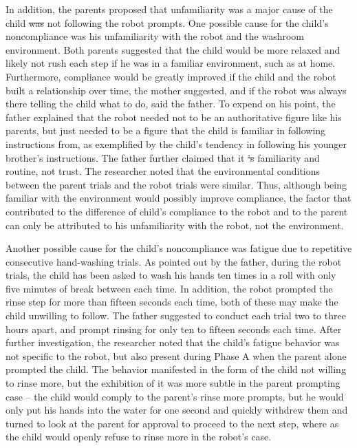 \documentclass{ut-thesis}
\providecommand{\DIFaddtex}[1]{{\protect\color{blue}\uwave{#1}}} %
\providecommand{\DIFdeltex}[1]{{\protect\color{red}\sout{#1}}}                      %
\providecommand{\DIFaddbegin}{} %
\providecommand{\DIFaddend}{} %
\providecommand{\DIFdelbegin}{} %
\providecommand{\DIFdelend}{} %
\providecommand{\DIFadd}[1]{\texorpdfstring{\DIFaddtex{#1}}{#1}} %
\providecommand{\DIFdel}[1]{\texorpdfstring{\DIFdeltex{#1}}{}} %
\begin{document}
In addition, the parents proposed that unfamiliarity was a major cause of the child \DIFdelbegin \DIFdel{was }\DIFdelend not following the robot prompts.  One possible cause for the child's noncompliance was his unfamiliarity with the robot and the washroom environment.  Both parents suggested that the child would be more relaxed and likely not rush each step if he was in a familiar environment, such as at home.  Furthermore, compliance would be greatly improved if the child and the robot built a relationship over time, the mother suggested, and if the robot was always there telling the child what to do, said the father.  To expend on his point, the father explained that the robot needed not to be an authoritative figure like his parents, but just needed to be a figure that the child is familiar in following instructions from, as exemplified by the child's tendency in following his younger brother's instructions.  The father further claimed that it \DIFdelbegin \DIFdel{'s }\DIFdelend \DIFaddbegin \DIFadd{was }\DIFaddend familiarity and routine, not trust.  The researcher noted that the environmental conditions between the parent trials and the robot trials were similar.  Thus, although being familiar with the environment would possibly improve compliance, the factor that contributed to the difference of child's compliance to the robot and to the parent can only be attributed to his unfamiliarity with the robot, not the environment.

Another possible cause for the child's noncompliance was fatigue due to repetitive consecutive hand-washing trials.  As pointed out by the father, during the robot trials, the child has been asked to wash his hands ten times in a roll with only five minutes of break between each time.  In addition, the robot prompted the rinse step for more than fifteen seconds each time, both of these may make the child unwilling to follow.  The father suggested to conduct each trial two to three hours apart, and prompt rinsing for only ten to fifteen seconds each time.  After further investigation, the researcher noted that the child's fatigue behavior was not specific to the robot, but also present during Phase A when the parent alone prompted the child.  The behavior manifested in the form of the child not willing to rinse more, but the exhibition of it was more subtle in the parent prompting case -- the child would comply to the parent's rinse more prompts, but he would only put his hands into the water for one second and quickly withdrew them and turned to look at the parent for approval to proceed to the next step, where as the child would openly refuse to rinse more in the robot's case.
\end{document}
